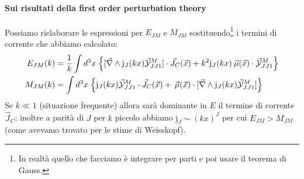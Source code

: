 \paragraph{Sui risultati della first order perturbation theory} 
Possiamo rielaborare le espressioni per $E_{JM}$ e $M_{JM}$ sostituendo\footnote{In realtà quello che facciamo è integrare per parti e poi usare il teorema di Gauss.} i termini di corrente che abbiamo calcolato:
\begin{displaymath}
\begin{aligned}
E_{JM}(k) &= \frac{1}{k} \int d^3x \; \Bigl \{ [\vec{\nabla}\land \mathrm{j}_J(kx) \vec{\mathcal{Y}}^M_{JJ1}] \cdot \vec{J}_C(\vec{x}) + k^2 \mathrm{j}_J(kx) \:\vec{\mu}(\vec{x})\cdot\vec{\mathcal{Y}}^M_{JJ1} \Bigr \} \\
M_{JM}(k) &=  \int d^3x \; \Bigl \{ \mathrm{j}_J(kx) \vec{\mathcal{Y}}^M_{JJ1}\cdot \vec{J}_C(\vec{x}) + \:\vec{\mu}(\vec{x})\cdot[\vec{\nabla}\land \mathrm{j}_J(kx) \vec{\mathcal{Y}}^M_{JJ1}] \Bigr \}
\end{aligned}
\end{displaymath}
Se $k\ll 1$ (situazione frequente) allora sarà dominante in $E$ il termine di corrente $\vec{J}_C$; inoltre a parità di $J$ per $k$ piccolo abbiamo $\mathrm{j}_J\sim (kx)^J$ per cui $E_{JM}>M_{JM}$ (come avevamo trovato per le stime di Weisskopf).

